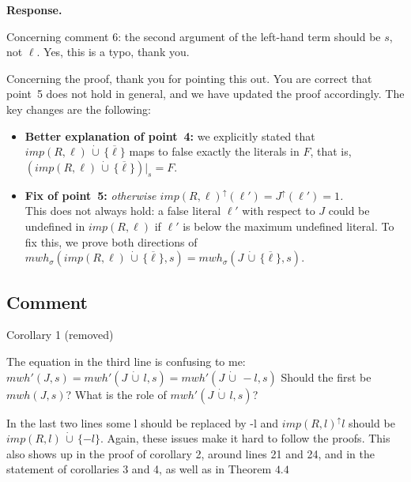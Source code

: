 \documentclass[11pt]{article}
\newcommand{\mwh}{\mathit{mwh}}
\newcommand{\cupdot}{\,\dot{\cup}\,}
\theoremstyle{definition}
\newcommand{\revieweranswered}{\subsection{Comment}}
\newenvironment{response}{
    \color{blue} \textbf{Response.}
}{
}
\begin{document}
\begin{response}
Concerning comment 6: the second argument of the left-hand term should be $s$, not $\ell$. Yes, this is a typo, thank you.

Concerning the proof, thank you for pointing this out.
You are correct that point~5 does not hold in general, and we have updated the proof accordingly. The key changes are the following:

\begin{itemize}
    \item \textbf{Better explanation of point~4:} we explicitly stated that $\mathit{imp}(R,\ell) \cupdot \{\overline{\ell}\}$ maps to false exactly the literals in $F$, that is, $(\mathit{imp}(R,\ell)\cupdot \{\overline{\ell}\})|_s=F$.

    \item \textbf{Fix of point~5:} \emph{otherwise $\mathit{imp}(R,\ell)^\uparrow(\ell') = J^\uparrow(\ell') = 1$.}\\
    This does not always hold: a false literal $\ell'$ with respect to $J$ could be undefined in $\mathit{imp}(R,\ell)$ if $\ell'$ is below the maximum undefined literal. To fix this, we prove both directions of $\mwh_\sigma(\mathit{imp}(R,\ell) \cupdot \{\overline{\ell}\}, s) = \mwh_\sigma(J \cupdot \{\overline{\ell}\}, s)$.
\end{itemize}

\end{response}

\vspace{0.5cm}

\revieweranswered
Corollary 1 (removed)

The equation in the third line is confusing to me:
$mwh'(J,s) = mwh'(J \cupdot l, s) = mwh'(J \cupdot -l, s)$
Should the first be $mwh(J,s)$? What is the role of $mwh'(J \cupdot l, s)$?

In the last two lines some {l} should be replaced by {-l}
and $imp(R,l)^\uparrow{l}$ should be $imp(R,l) \cupdot \{-l\}$.
Again, these issues make it hard to follow the proofs.
This also shows up in the proof of corollary 2, around lines 21 and 24,
and in the statement of corollaries 3 and 4,
as well as in Theorem $4.4$
\end{document}
